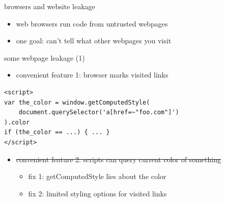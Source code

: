 \begin{frame}{browsers and website leakage}
    \begin{itemize}
    \item web browsers run code from untrusted webpages
    \item one goal: can't tell what other webpages you visit
    \end{itemize}
\end{frame}

\begin{frame}[fragile]{some webpage leakage (1)}
\begin{itemize}
\item convenient feature 1: browser marks visited links
\end{itemize}
\begin{lstlisting}[style=smaller,language={}]
<script>
var the_color = window.getComputedStyle(
    document.querySelector('a[href=~"foo.com"]')
).color
if (the_color == ...) { ... }
</script>
\end{lstlisting}
\begin{itemize}
\item \sout<2->{convenient feature 2: scripts can query current color of something}
    \begin{itemize}
    \item<2-> fix 1: getComputedStyle lies about the color
    \item<2-> fix 2: limited styling options for visited links
    \end{itemize}
\end{itemize}
\end{frame}

